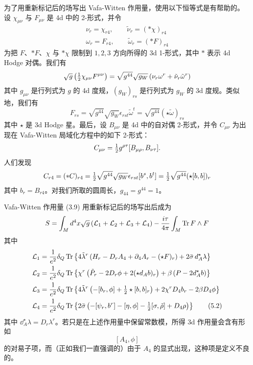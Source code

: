 

为了用重新标记后的场写出 Vafa-Witten 作用量，使用以下恒等式是有帮助的。设 $\chi_{\mu\nu}$ 与 $F_{\mu\nu}$ 是 4d 中的 2-形式，并令
\begin{gather*}
    \nu_r = \chi_{r4}, \qquad \tilde\nu_r = (\ast\chi)_{r4} \\
    \omega_r = F_{r4}, \qquad \tilde\omega_r = (\ast F)_{r4}
\end{gather*}
为把 $F$、$\ast F$、$\chi$ 与 $\ast\chi$ 限制到 $1,2,3$ 方向所得的 3d 1-形式，其中 $\ast$ 表示 4d Hodge 对偶。我们有
\[
    \sqrt{g}\left(\tfrac{1}{2}\chi_{\mu\nu}F^{\mu\nu}\right)
    = \sqrt{g^{44}}\sqrt{g_W}\left(\nu_r\omega^r + \tilde\nu_r\tilde\omega^r\right)
\]
其中 $g_{\mu\nu}$ 是行列式为 $g$ 的 4d 度规，$(g_W)_{rs}$ 是行列式为 $g_W$ 的 3d 度规。类似地，我们有
\[
    F_{rs} = \sqrt{g^{44}}\sqrt{g_W}\epsilon_{rst}\tilde\omega^t
    = \sqrt{g^{44}}(\star\tilde\omega)_{rs}
\]
其中 $\star$ 是 3d Hodge 星。最后，设 $B_{\mu\nu}$ 是 4d 中的自对偶 2-形式，并令 $C_{\mu\nu}$ 为出现在 Vafa-Witten 局域化方程中的如下 2-形式：
\[
    C_{\mu\nu} = \tfrac{1}{2} g^{\rho\tau}[B_{\mu\rho},B_{\nu\tau}] .
\]
人们发现
\[
    C_{r4} = (\ast C)_{r4} = \tfrac{1}{2}\sqrt{g^{44}}\sqrt{g_W}\epsilon_{rst}[b^s,b^t]
    = \tfrac{1}{2}\sqrt{g^{44}}(\star[b,b])_r
\]
其中 $b_r=B_{r4}$。对我们所取的圆周长，$g_{44}=g^{44}=1$。


Vafa-Witten 作用量 (3.9) 用重新标记后的场写出后成为
\[
    S = \int_M d^4x\sqrt{g}\left(\mathcal{L}_1+\mathcal{L}_2+\mathcal{L}_3+\mathcal{L}_4\right)
    - \frac{i\tau}{4\pi}\int_M \operatorname{Tr} F\wedge F
\]
其中
\begin{align}
    \mathcal{L}_1 &= \frac{1}{e^2}\delta_Q\operatorname{Tr}\left\{4\tilde\lambda^r\left(H_r - D_rA_4 + \partial_4A_r - (\star F)_r\right) + 2\bar\sigma\, d_A^\star\lambda\right\} \notag\\
    \mathcal{L}_2 &= \frac{1}{e^2}\delta_Q\operatorname{Tr}\left\{\chi^r\left(\tilde P_r - 2D_r\phi + 2(\star d_Ab)_r\right) + \beta\left(P - 2d_A^\star b\right)\right\} \notag\\
    \mathcal{L}_3 &= \frac{1}{e^2}\delta_Q\operatorname{Tr}\left\{4\tilde\lambda^r\left(-[b_r,\phi] + \tfrac{1}{2}\star[b,b]_r\right) + 2\chi^rD_4b_r - 2\beta D_4\phi\right\} \notag\\
    \mathcal{L}_4 &= \frac{1}{e^2}\delta_Q\operatorname{Tr}\left\{2\bar\sigma\left(-[\psi_r,b^r] - [\eta,\phi] - \tfrac{1}{2}[\sigma,\tilde\rho] + D_4\rho\right)\right\} \tag{5.2}
\end{align}
其中 $\dd_A^\star\lambda = D_r\lambda^r$。若只是在上述作用量中保留常数模，所得 3d 作用量会含有形如
\[
    [A_4,\phi]
\]
的对易子项，而（正如我们一直强调的）由于 $A_4$ 的显式出现，这种项是定义不良的。

